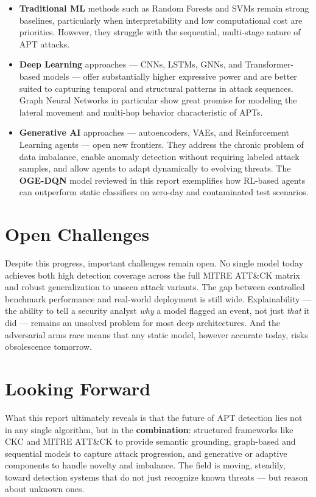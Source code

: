 ﻿\documentclass[11pt,a4paper]{report}
\begin{document}
\begin{itemize}
    \item \textbf{Traditional ML} methods such as Random Forests and SVMs
    remain strong baselines, particularly when interpretability and low
    computational cost are priorities. However, they struggle with the
    sequential, multi-stage nature of APT attacks.

    \item \textbf{Deep Learning} approaches --- CNNs, LSTMs, GNNs, and
    Transformer-based models --- offer substantially higher expressive power
    and are better suited to capturing temporal and structural patterns in
    attack sequences. Graph Neural Networks in particular show great promise
    for modeling the lateral movement and multi-hop behavior characteristic
    of APTs.

    \item \textbf{Generative AI} approaches --- autoencoders, VAEs, and
    Reinforcement Learning agents --- open new frontiers. They address the
    chronic problem of data imbalance, enable anomaly detection without
    requiring labeled attack samples, and allow agents to adapt dynamically
    to evolving threats. The \textbf{OGE-DQN} model reviewed in this report
    exemplifies how RL-based agents can outperform static classifiers on
    zero-day and contaminated test scenarios.
\end{itemize}

\section*{Open Challenges}

Despite this progress, important challenges remain open. No single model
today achieves both high detection coverage across the full MITRE ATT\&CK
matrix and robust generalization to unseen attack variants. The gap between
controlled benchmark performance and real-world deployment is still wide.
Explainability --- the ability to tell a security analyst \textit{why} a
model flagged an event, not just \textit{that} it did --- remains an unsolved
problem for most deep architectures. And the adversarial arms race means that
any static model, however accurate today, risks obsolescence tomorrow.

\section*{Looking Forward}

What this report ultimately reveals is that the future of APT detection lies
not in any single algorithm, but in the \textbf{combination}: structured
frameworks like CKC and MITRE ATT\&CK to provide semantic grounding,
graph-based and sequential models to capture attack progression, and
generative or adaptive components to handle novelty and imbalance. The field
is moving, steadily, toward detection systems that do not just recognize known
threats --- but reason about unknown ones.
\end{document}
